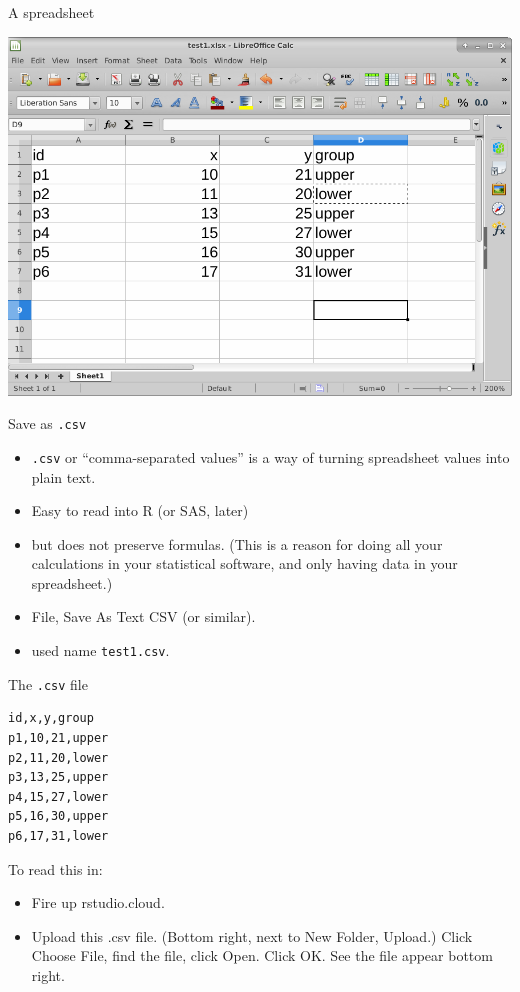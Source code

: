 \documentclass[ignorenonframetext,]{beamer}
\providecommand{\tightlist}{%
  \setlength{\itemsep}{0pt}\setlength{\parskip}{0pt}}
\begin{document}
\begin{frame}{A spreadsheet}
\protect\hypertarget{a-spreadsheet}{}

\includegraphics{spreadsheet.png}

\end{frame}

\begin{frame}[fragile]{Save as \texttt{.csv}}
\protect\hypertarget{save-as-.csv}{}

\begin{itemize}
\tightlist
\item
  \texttt{.csv} or ``comma-separated values'' is a way of turning
  spreadsheet values into plain text.
\item
  Easy to read into R (or SAS, later)
\item
  but does not preserve formulas. (This is a reason for doing all your
  calculations in your statistical software, and only having data in
  your spreadsheet.)
\item
  File, Save As Text CSV (or similar).
\item
  used name \texttt{test1.csv}.
\end{itemize}

\end{frame}

\begin{frame}[fragile]{The \texttt{.csv} file}
\protect\hypertarget{the-.csv-file}{}

\begin{verbatim}
id,x,y,group
p1,10,21,upper
p2,11,20,lower
p3,13,25,upper
p4,15,27,lower
p5,16,30,upper
p6,17,31,lower
\end{verbatim}

To read this in:

\begin{itemize}
\tightlist
\item
  Fire up rstudio.cloud.
\item
  Upload this .csv file. (Bottom right, next to New Folder, Upload.)
  Click Choose File, find the file, click Open. Click OK. See the file
  appear bottom right.
\end{itemize}

\end{frame}
\end{document}
